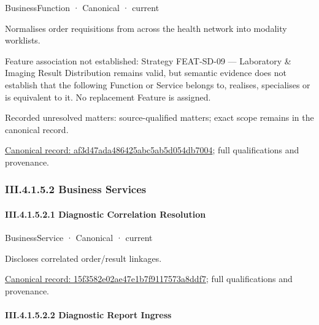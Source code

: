 \label{element:af3d47ada486425abc5ab5d054db7004}
{\small BusinessFunction · Canonical · current}\par

Normalises order requisitions from across the health network into modality worklists.



Feature association not established: Strategy FEAT-SD-09 — Laboratory \& Imaging Result Distribution remains valid, but semantic evidence does not establish that the following Function or Service belongs to, realises, specialises or is equivalent to it. No replacement Feature is assigned.


{\small Recorded unresolved matters: source-qualified matters; exact scope remains in the canonical record.}\par
{\footnotesize \href{../../../../continuum/business/business-function/af3d47ada486425abc5ab5d054db7004.md}{Canonical record: af3d47ada486425abc5ab5d054db7004}; full qualifications and provenance.}\par
\subsubsection*{III.4.1.5.2 Business Services}
\label{navigation:III.4.1.5.2}

\paragraph*{III.4.1.5.2.1 Diagnostic Correlation Resolution}
\label{navigation:III.4.1.5.2.1}

\label{element:15f3582e02ae47e1b7f9117573a8ddf7}
{\small BusinessService · Canonical · current}\par

Discloses correlated order/result linkages.


{\footnotesize \href{../../../../continuum/business/business-service/15f3582e02ae47e1b7f9117573a8ddf7.md}{Canonical record: 15f3582e02ae47e1b7f9117573a8ddf7}; full qualifications and provenance.}\par
\paragraph*{III.4.1.5.2.2 Diagnostic Report Ingress}
\label{navigation:III.4.1.5.2.2}

